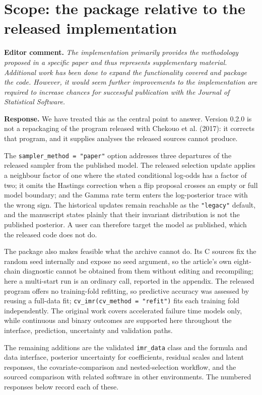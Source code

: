 \documentclass[11pt]{article}
\newcommand{\code}[1]{\texttt{#1}}
\newenvironment{editorcomment}
  {\par\smallskip\sloppy\noindent\textbf{Editor comment.}\itshape}
  {\par\smallskip\fussy}
\newenvironment{response}
  {\noindent\textbf{Response.}}
  {\par\smallskip}
\begin{document}
\section*{Scope: the package relative to the released implementation}
\begin{editorcomment}
The implementation primarily provides the methodology proposed in a specific
paper and thus represents supplementary material. Additional work has been done
to expand the functionality covered and package the code. However, it would seem
further improvements to the implementation are required to increase chances for
successful publication with the Journal of Statistical Software.
\end{editorcomment}
\begin{response}
We have treated this as the central point to answer. Version 0.2.0 is not a
repackaging of the program released with Chekouo et al. (2017): it corrects that
program, and it supplies analyses the released sources cannot produce.

The \code{sampler\_method = "paper"} option addresses three departures of the
released sampler from the published model. The released selection update applies a
neighbour factor of one where the stated conditional log-odds has a factor of
two; it omits the Hastings correction when a flip proposal crosses an
empty or full model boundary; and the Gamma rate term enters the log-posterior
trace with the wrong sign. The historical updates remain reachable as the
\code{"legacy"} default, and the manuscript states plainly that their invariant
distribution is not the published posterior. A user can therefore target the
model as published, which the released code does not do.

The package also makes feasible what the archive cannot do. Its C
sources fix the random seed internally and expose no seed argument, so the
article's own eight-chain diagnostic cannot be obtained from them without
editing and recompiling; here a multi-start run is an ordinary call, reported in
the appendix. The released program offers no training-fold refitting, so
predictive accuracy was assessed by reusing a full-data fit;
\code{cv\_imr(cv\_method = "refit")} fits each training fold independently. The
original work covers accelerated failure time models only, while continuous and
binary outcomes are supported here throughout the interface, prediction,
uncertainty and validation paths.

The remaining additions are the validated \code{imr\_data} class and the
formula and data interface, posterior uncertainty for coefficients, residual
scales and latent responses, the covariate-comparison and nested-selection
workflow, and the sourced comparison with related software in other
environments. The numbered responses below record each of these.
\end{response}
\end{document}
